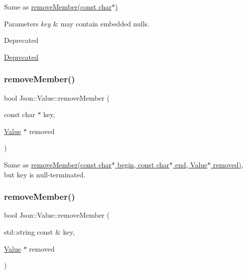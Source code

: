 Same as \hyperlink{class_json_1_1_value_aa52f7873b95d29627d6e83ba96f69aaa}{remove\+Member(const char$\ast$)} 
\begin{DoxyParams}{Parameters}
{\em key} & may contain embedded nulls. \\
\hline
\end{DoxyParams}
\begin{DoxyRefDesc}{Deprecated}
\item[\hyperlink{deprecated__deprecated000002}{Deprecated}]\end{DoxyRefDesc}
\mbox{\label{class_json_1_1_value_a708e599489adf30d65bf85a8ee16e6fb}} 
\subsubsection{\texorpdfstring{remove\+Member()}{removeMember()}\hspace{0.1cm}{\footnotesize\ttfamily [3/4]}}
{\footnotesize\ttfamily bool Json\+::\+Value\+::remove\+Member (\begin{DoxyParamCaption}\item[{const char $\ast$}]{key,  }\item[{\hyperlink{class_json_1_1_value}{Value} $\ast$}]{removed }\end{DoxyParamCaption})}

Same as \hyperlink{class_json_1_1_value_a49c91af727d6b4eb0af02a81bb2def87}{remove\+Member(const char$\ast$ begin, const char$\ast$ end, Value$\ast$ removed)}, but \textquotesingle{}key\textquotesingle{} is null-\/terminated. \mbox{\label{class_json_1_1_value_a3749dae413a73eac05b7f8dc6deeb6a2}} 
\subsubsection{\texorpdfstring{remove\+Member()}{removeMember()}\hspace{0.1cm}{\footnotesize\ttfamily [4/4]}}
{\footnotesize\ttfamily bool Json\+::\+Value\+::remove\+Member (\begin{DoxyParamCaption}\item[{std\+::string const \&}]{key,  }\item[{\hyperlink{class_json_1_1_value}{Value} $\ast$}]{removed }\end{DoxyParamCaption})}



